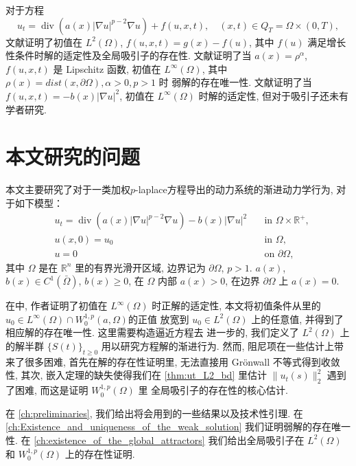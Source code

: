 \documentclass[twoside,longtitle]{LZUthesis}
\theoremstyle{definition}
\numberwithin{equation}{chapter}
\newcommand*\abs[1]{\lvert#1\rvert}
\newcommand*\norm[1]{\lVert#1\rVert}
\newcommand*\Brace[1]{\lbrace#1\rbrace}
\newcommand\R{\mathbb{R}}
\DeclareMathOperator{\Div}{div}
\begin{document}
对于方程
\begin{equation}
	u_t = \Div(a(x)\abs{\nabla u}^{p-2}\nabla u) + f(u, x, t), \quad (x, t) \in Q_T = \Omega \times (0, T),
\end{equation}
文献\citep{maGlobalAttractorsWeighted2012a}证明了初值在 $L^2(\Omega)$, $f(u, x, t) = g(x) - f(u)$, 其中 $f(u)$ 满足增长性条件时解的适定性及全局吸引子的存在性.
文献\citep{zhanParabolicEquationRelated2016}证明了当
$a(x) = \rho^\alpha$, $f(u, x, t)$ 是 Lipschitz 函数, 初值在 $L^\infty(\Omega)$, 其中 $\rho(x) = dist(x, \partial \Omega), \alpha > 0, p > 1$ 时
弱解的存在唯一性. 文献\citep{Zhan2019Uniquenessa}证明了当 $f(u, x, t) = -b(x)\abs{\nabla u}^2$, 初值在 $L^\infty(\Omega)$ 时解的适定性, 但对于吸引子还未有学者研究.

\section{本文研究的问题}
本文主要研究了对于一类加权$p$-laplace方程导出的动力系统的渐进动力学行为,
对于如下模型：
\begin{equation}\label{eq:main}
	\begin{alignedat}{2}
		& u_t = \Div(a(x)\abs{\nabla u}^{p-2}\nabla u) - b(x)\abs{\nabla u}^2 \quad &\text{in } \Omega \times \R^+,\\
		& u(x,0) = u_0 \quad &\text{in } \Omega,\\
		& u = 0 \quad &\text{on } \partial\Omega,
	\end{alignedat}
\end{equation}
其中 $\Omega$ 是在 $\R^{n}$ 里的有界光滑开区域, 边界记为 $\partial\Omega$, $p>1$.
$ a(x)$, $b(x) \in C^1(\bar{\Omega}) $, $b(x) \geq 0$, 在 $\Omega$ 内部 $a(x) > 0$, 在边界 $\partial\Omega$ 上 $a(x) = 0$.

在\citep{Zhan2019Uniquenessa}中, 作者证明了初值在 $L^\infty(\Omega)$ 时正解的适定性,
本文将初值条件从\citep{Zhan2019Uniquenessa}里的$u_0 \in L^{\infty}(\Omega) \cap W_0^{1,p}(a,\Omega)$的正值
放宽到 $u_0 \in L^2(\Omega)$ 上的任意值, 并得到了相应解的存在唯一性.
这里需要构造逼近方程去
进一步的, 我们定义了 $L^2(\Omega) $ 上的解半群 $\Brace{S(t)}_{t \geq 0} $ 用以研究方程解的渐进行为.
然而, 阻尼项在一些估计上带来了很多困难, 首先在解的存在性证明里,
无法直接用 Gr\"onwall 不等式得到收敛性,
其次, 嵌入定理的缺失使得我们在 \cref{thm:ut_L2_bd} 里估计
$\norm{u_t(s)}_2^2$ 遇到了困难, 而这是证明 $W_0^{1,p}(\Omega)$ 里
全局吸引子的存在性的核心估计.

在 \cref{ch:preliminaries},
我们给出将会用到的一些结果以及技术性引理. 在
\cref{ch:Existence_and_uniqueness_of_the_weak_solution}
我们证明弱解的存在唯一性.
在 \cref{ch:existence_of_the_global_attractors}
我们给出全局吸引子在
$L^2(\Omega)$ 和 $W_0^{1,p}(\Omega)$ 上的存在性证明.
\end{document}
